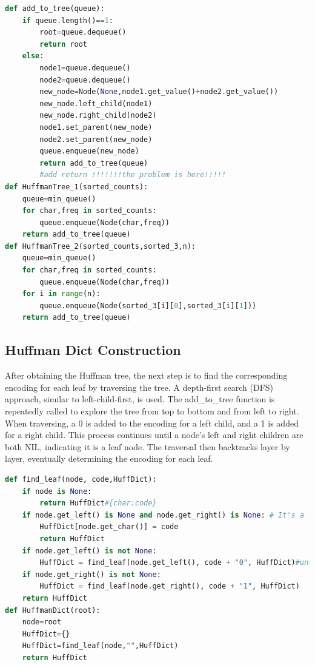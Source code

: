 \documentclass[12pt]{article}
\begin{document}
\begin{tcolorbox}[colframe=black, colback=white, boxrule=0.4mm, sharp corners=southwest, title=Huffman Tree Construction Code]
    \begin{lstlisting}[language=Python, breaklines=true]
def add_to_tree(queue):
    if queue.length()==1:
        root=queue.dequeue()
        return root
    else:
        node1=queue.dequeue()
        node2=queue.dequeue()
        new_node=Node(None,node1.get_value()+node2.get_value())
        new_node.left_child(node1)
        new_node.right_child(node2)
        node1.set_parent(new_node)
        node2.set_parent(new_node)
        queue.enqueue(new_node)
        return add_to_tree(queue) 
        #add return !!!!!!!the problem is here!!!!!
def HuffmanTree_1(sorted_counts):
    queue=min_queue()
    for char,freq in sorted_counts:
        queue.enqueue(Node(char,freq))
    return add_to_tree(queue)
def HuffmanTree_2(sorted_counts,sorted_3,n):
    queue=min_queue()
    for char,freq in sorted_counts:
        queue.enqueue(Node(char,freq))
    for i in range(n):
        queue.enqueue(Node(sorted_3[i][0],sorted_3[i][1]))
    return add_to_tree(queue)
\end{lstlisting}
\end{tcolorbox}
\subsection{Huffman Dict Construction}
\par After obtaining the Huffman tree, the next step is to find the corresponding encoding for each leaf by traversing the tree. A depth-first search (DFS) approach, similar to left-child-first, is used. The add\_to\_tree function is repeatedly called to explore the tree from top to bottom and from left to right. When traversing, a 0 is added to the encoding for a left child, and a 1 is added for a right child. This process continues until a node's left and right children are both NIL, indicating it is a leaf node. The traversal then backtracks layer by layer, eventually determining the encoding for each leaf.
\begin{tcolorbox}[colframe=black, colback=white, boxrule=0.4mm, sharp corners=southwest, title=Huffman Dict Construction Code]
    \begin{lstlisting}[language=Python, breaklines=true]
def find_leaf(node, code,HuffDict):
    if node is None:
        return HuffDict#{char:code}
    if node.get_left() is None and node.get_right() is None: # It's a leaf node
        HuffDict[node.get_char()] = code
        return HuffDict
    if node.get_left() is not None:
        HuffDict = find_leaf(node.get_left(), code + "0", HuffDict)#until found the lefest node
    if node.get_right() is not None:
        HuffDict = find_leaf(node.get_right(), code + "1", HuffDict)
    return HuffDict      
def HuffmanDict(root):
    node=root
    HuffDict={}
    HuffDict=find_leaf(node,"",HuffDict)
    return HuffDict  
\end{lstlisting}
\end{tcolorbox}
\end{document}

